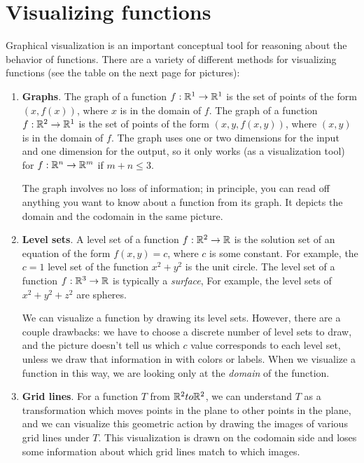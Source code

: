 \documentclass[svgnames]{watsonbook}
\begin{document}
\newpage

\section{Visualizing functions}

  Graphical visualization is an important conceptual tool for reasoning
  about the behavior of functions. There are a variety of different
  methods for visualizing functions (see the table on the next page
  for pictures):

  \begin{tcolorbox}[title = Function Visualization Methods, colback =
    softblue, colframe = MidnightBlue] 
  \begin{enumerate}[leftmargin = 12pt, itemsep = 6pt, parsep = 6pt]
  \item \textbf{Graphs}. The graph of a function $f : \mathbb{R}^1 \to \mathbb{R}^1$ is
    the set of points of the form $(x,f(x))$, where $x$ is in the
    domain of $f$. The graph of a function $f : \mathbb{R}^2 \to \mathbb{R}^1$ is
    the set of points of the form $(x,y,f(x,y))$, where $(x,y)$ is in the
    domain of $f$. The graph uses one or two dimensions for the input
    and one dimension for the output, so it only works (as a
    visualization tool) for $f : \mathbb{R}^n \to \mathbb{R}^m$ if $m + n \leq 3$.

    The graph involves no loss of information; in principle, you can
    read off anything you want to know about a function from its
    graph. It depicts the domain and the codomain in the same picture. 
    
  \item \textbf{Level sets}. A level set of a function $f:\mathbb{R}^2 \to \mathbb{R}$
    is the solution set of an equation of the form $f(x,y) = c$, where
    $c$ is some constant. For example, the $c=1$ level set of the
    function $x^2 + y^2$ is the unit circle. The level set of a
    function $f:\mathbb{R}^3 \to \mathbb{R}$ is typically a \textit{surface}, For
    example, the level sets of $x^2 + y^2 + z^2$ are spheres.

    We can visualize a function by drawing its level sets. However,
    there are a couple drawbacks: we have to choose a discrete number
    of level sets to draw, and the picture doesn't tell us which $c$
    value corresponds to each level set, unless we draw that
    information in with colors or labels. When we visualize a function
    in this way, we are looking only at the \textit{domain} of the
    function. 

  \item \textbf{Grid lines}. For a function $T$ from $\mathbb{R}^2 to \mathbb{R}^2$, we can
    understand $T$ as a transformation which moves points in the plane
    to other points in the plane, and we can visualize this geometric
    action by drawing the images of various grid lines under $T$. This
    visualization is drawn on the codomain side and loses some
    information about which grid lines match to which images. 
    

\end{enumerate}
\end{tcolorbox}
\end{document}
